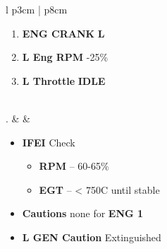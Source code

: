 \documentclass[fontHelvetica, widesubsec]{TechCheck}
\begin{document}
\begin{center}
\begin{longtable}{l p{3cm} | p{8cm}}
			\begin{minipage}[t]{\linewidth}
				\vspace{-7pt}
				\begin{enumerate}
					\item \textbf{ENG CRANK} \dotfill \textbf{L}
					\item \textbf{L Eng RPM} -25\%
					\item \textbf{L Throttle} \dotfill \textbf{IDLE}
				\end{enumerate}
			\end{minipage} \\
			. &  &
			\begin{minipage}[t]{\linewidth}
				\vspace{-7pt}
				\begin{itemize}
					\item \textbf{IFEI} \dotfill Check
					\begin{itemize}
						\item \textbf{RPM} -- 60-65\%
						\item \textbf{EGT} -- < 750C until stable
					\end{itemize}
					\item \textbf{Cautions} \dotfill none for \textbf{ENG 1}
					\item \textbf{L GEN Caution} \dotfill Extinguished
				\end{itemize}
			\end{minipage} \\
			\bottomrule
		\end{longtable}
	\end{center}
\end{document}
